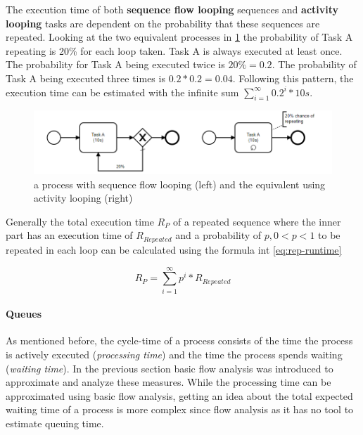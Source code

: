 \begin{itemize}
	The execution time of both \textbf{sequence flow looping} sequences and \textbf{activity looping} tasks are dependent on the probability that these sequences are repeated. Looking at the two equivalent processes in \ref{fig:repeated-example} the probability of Task A repeating is 20\% for each loop taken. Task A is always executed at least once. The probability for Task A being executed twice is $20\% = 0.2$. The probability of Task A being executed three times is $0.2 * 0.2 = 0.04$. Following this pattern, the execution time can be estimated with the infinite sum $\displaystyle\sum_{i=1}^{\infty} 0.2^i * 10s$.
	
	
	\begin{figure}[H]
		\centering
		\includegraphics[width=0.9\columnwidth]{graphics/repeated-example}
		\caption{a process with sequence flow looping (left) and the equivalent using activity looping (right)} 
		\label{fig:repeated-example} 
	\end{figure}
	
	Generally the total execution time  $R_P$ of a repeated sequence where the inner part has an execution time of $R_{Repeated}$ and a probability of $p, 0 < p < 1$  to be repeated in each loop can be calculated using the formula int \ref{eq:rep-runtime}
	
	\begin{equation}\label{eq:rep-runtime}
		R_P = \displaystyle\sum_{i=1}^{\infty} p^i * R_{Repeated}
	\end{equation}
\end{itemize}


\paragraph{Queues}
As mentioned before, the \gls{cycle-time} of a process consists of the time the process is actively executed (\textit{processing time}) and the time the process spends waiting (\textit{waiting time}). In the previous section basic flow analysis was introduced to approximate and analyze these measures.  
While the processing time can be approximated using basic flow analysis, getting an idea about the total expected waiting time of a process is more complex since flow analysis as it has no tool to estimate queuing time. 

